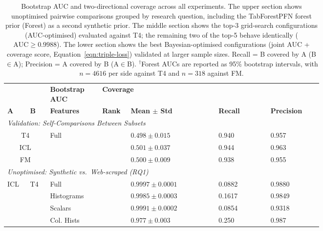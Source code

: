 \documentclass{article}
\begin{document}
\begin{table}[ht]
\caption{Bootstrap AUC and two-directional coverage across all experiments. The upper section shows unoptimised pairwise comparisons grouped by research question, including the TabForestPFN forest prior (Forest) as a second synthetic prior. The middle section shows the top-3 grid-search configurations (AUC-optimised) evaluated against T4; the remaining two of the top-5 behave identically ($\text{AUC} \geq 0.9988$). The lower section shows the best Bayesian-optimised configurations (joint AUC + coverage score, Equation~\ref{eqn:triple-loss}) validated at larger sample sizes. Recall = B covered by A (B$\in$A); Precision = A covered by B (A$\in$B). $^\dagger$Forest AUCs are reported as 95\% bootstrap intervals, with $n = 4616$ per side against T4 and $n = 318$ against FM.}
\label{tab:combined-results}
\small
\centering
\begin{tabular}{p{0.05\linewidth} p{0.05\linewidth} p{0.13\linewidth} p{0.04\linewidth} p{0.22\linewidth} p{0.13\linewidth} p{0.13\linewidth}}
\toprule
\addlinespace[4pt]
\multicolumn{3}{l}{\textbf{Dataset}} &
&
\multicolumn{1}{l}{\textbf{Bootstrap AUC}} &
\multicolumn{2}{l}{\textbf{Coverage}} \\
\cmidrule(lr){1-4}  \cmidrule(lr){5-5} \cmidrule(lr){6-7}
\textbf{A} & \textbf{B} & \textbf{Features} & \multicolumn{1}{l}{\textbf{Rank}} &
\textbf{Mean $\pm$ Std} &
\textbf{Recall} & \textbf{Precision} \\
\midrule
\multicolumn{7}{l}{\textit{Validation: Self-Comparisons Between Subsets}} \\
\midrule
\multicolumn{2}{c}{T4} & \multirow{3}{*}{Full}        & & $0.498  \pm  0.015$ &   0.940   &   0.957 \\
\multicolumn{2}{c}{ICL} & & & $0.501  \pm  0.037$   & 0.944   &   0.963 \\
\multicolumn{2}{c}{FM} & & & $0.500  \pm  0.009$   & 0.938   &   0.955 \\
\midrule
\multicolumn{7}{l}{\textit{Unoptimised: Synthetic vs.\ Web-scraped (RQ1)}} \\
\midrule
\multirow{3}{*}{ICL} & \multirow{3}{*}{T4}
 & Full        & & $0.9997 \pm 0.0001$ & 0.0882 & 0.9880 \\
 && Histograms   & & $0.9985 \pm 0.0003$ & 0.1617 & 0.9849 \\
 && Scalars & & $0.9991 \pm 0.0002$ & 0.0854 & 0.9318 \\
 \cmidrule(lr){3-7}
 && Col. Hists & & $0.977 \pm 0.003$ & 0.250 & 0.987 \\

\end{tabular}
\end{table}
\end{document}
